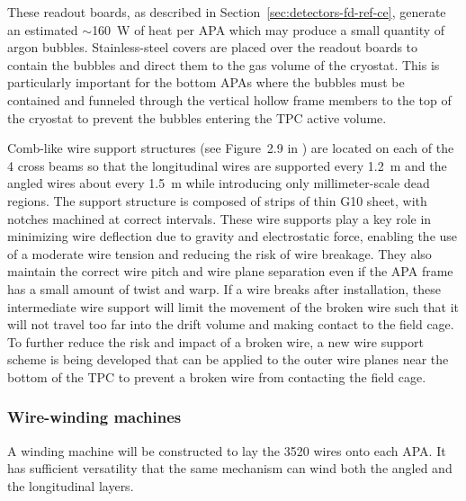 These readout boards, as described in
Section~\ref{sec:detectors-fd-ref-ce}, generate an estimated
$\sim$160~W of heat per APA which may produce a small quantity of
argon bubbles.  Stainless-steel covers are placed over the readout
boards to contain the bubbles and direct them to the gas volume of the
cryostat. This is particularly important for the bottom APAs where the
bubbles must be contained and funneled through the vertical hollow
frame members to the top of the cryostat to prevent the bubbles
entering the TPC active volume.

Comb-like wire support structures (see Figure~2.9 in \anxlbnefd) are
located on each of the 4 cross beams so that the longitudinal wires
are supported every 1.2~m and the angled wires about every 1.5~m while
introducing only millimeter-scale dead regions. The support structure
is composed of strips of thin G10 sheet, with notches machined at
correct intervals.  These wire supports play a key role in minimizing
wire deflection due to gravity and electrostatic force, enabling the
use of a moderate wire tension and reducing the risk of wire breakage.
They also maintain the correct wire pitch and wire plane separation
even if the APA frame has a small amount of twist and warp.  If a wire
breaks after installation, these intermediate wire support will limit
the movement of the broken wire such that it will not travel too far
into the drift volume and making contact to the field cage.  To
further reduce the risk and impact of a broken wire, a new wire
support scheme is being developed that can be applied to the outer
wire planes near the bottom of the TPC to prevent a broken wire from
contacting the field cage.


\subsubsection{Wire-winding machines}
\label{subsec:fd-ref-wirewinding}

A winding machine will be constructed to lay the 3520 wires onto each
APA. It has sufficient versatility that the same mechanism can wind
both the angled and the longitudinal layers.
 
